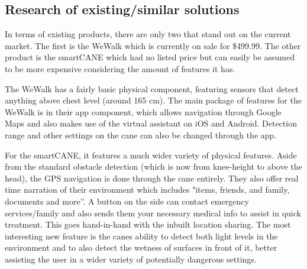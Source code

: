 \documentclass[letterpaper,12pt]{article}
\begin{document}
\subsection{Research of existing/similar solutions}
In terms of existing products, there are only two that stand out on the current market. The first is the WeWalk which is currently on sale for \$499.99. The other product is the smartCANE which had no listed price but can easily be assumed to be more expensive considering the amount of features it has. \par
The WeWalk has a fairly basic physical component, featuring sensors that detect anything above chest level (around 165 cm). The main package of features for the WeWalk is in their app component, which allows navigation through Google Maps and also makes use of the virtual assistant on iOS and Android. Detection range and other settings on the cane can also be changed through the app. \par
For the smartCANE, it features a much wider variety of physical features. Aside from the standard obstacle detection (which is now from knee-height to above the head), the GPS navigation is done through the cane entirely. They also offer real time narration of their environment which includes "items, friends, and family, documents and more”. A button on the side can contact emergency services/family and also sends them your necessary medical info to assist in quick treatment. This goes hand-in-hand with the inbuilt location sharing. The most interesting new feature is the canes ability to detect both light levels in the environment and to also detect the wetness of surfaces in front of it, better assisting the user in a wider variety of potentially dangerous settings.
\end{document}
